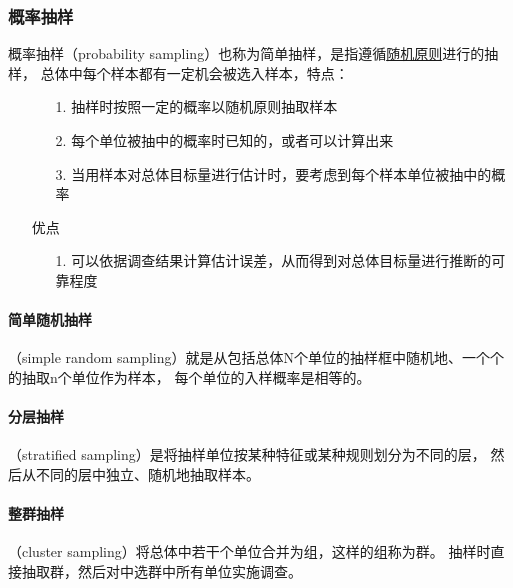 \documentclass[UTF8,10pt]{book}
\begin{document}
    \subsubsection{概率抽样}

    概率抽样（probability sampling）也称为简单抽样，是指遵循\underline{随机原则}进行的抽样，
    总体中每个样本都有一定机会被选入样本，特点：

	\begin{itemize}
		\item [] {
			\begin{enumerate}
				\item [1.] 抽样时按照一定的概率以随机原则抽取样本
				\item [2.] 每个单位被抽中的概率时已知的，或者可以计算出来
				\item [3.] 当用样本对总体目标量进行估计时，要考虑到每个样本单位被抽中的概率
			\end{enumerate}
		}
    \end{itemize}

	\begin{itemize}
		\item [优点] {
			\begin{enumerate}
				\item [1.] 可以依据调查结果计算估计误差，从而得到对总体目标量进行推断的可靠程度
			\end{enumerate}
		}
	\end{itemize}
    
    \paragraph{简单随机抽样}

    （simple random sampling）就是从包括总体N个单位的抽样框中随机地、一个个的抽取n个单位作为样本，
    每个单位的入样概率是相等的。

    \paragraph{分层抽样}

    （stratified sampling）是将抽样单位按某种特征或某种规则划分为不同的层，
    然后从不同的层中独立、随机地抽取样本。

    \paragraph{整群抽样}

    （cluster sampling）将总体中若干个单位合并为组，这样的组称为群。
    抽样时直接抽取群，然后对中选群中所有单位实施调查。
    
\end{document}
